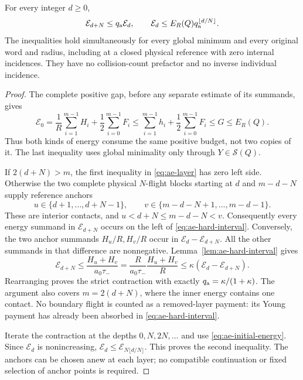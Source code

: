 \begin{theorem}
\label{thm:ae-layer}
For every integer $d\ge0$,
\begin{equation}\label{eq:ae-layer}
 \mathcal E_{d+N}\le q_{\rm a}\mathcal E_d,
 \qquad
 \mathcal E_d\le E_R(Q)q_{\rm a}^{\lfloor d/N\rfloor}.
\end{equation}
The inequalities hold simultaneously for every global minimum and
every original word and radius, including at a closed physical
reference with zero internal incidences.  They have no collision-count
prefactor and no inverse individual incidence.
\end{theorem}
\begin{proof}
The complete positive gap, before any separate estimate of its
summands, gives
\begin{equation}\label{eq:ae-initial-energy}
 \mathcal E_0
 =\frac1R\sum_{i=1}^{m-1}H_i+\frac12\sum_{i=0}^{m-1}F_i
 \le\sum_{i=1}^{m-1}h_i+\frac12\sum_{i=0}^{m-1}F_i
 \le G\le E_R(Q).
\end{equation}
Thus both kinds of energy consume the same positive budget, not
two copies of it.  The last inequality uses global minimality only
through $Y\in\mathcal S(Q)$.

If $2(d+N)>m$, the first inequality in \eqref{eq:ae-layer} has zero
left side.  Otherwise the two complete physical $N$-flight blocks
starting at $d$ and $m-d-N$ supply reference anchors
\[
 u\in\{d+1,\ldots,d+N-1\},\qquad
 v\in\{m-d-N+1,\ldots,m-d-1\}.
\]
These are interior contacts, and $u<d+N\le m-d-N<v$.
Consequently every energy summand in $\mathcal E_{d+N}$ occurs
on the left of \eqref{eq:ae-hard-interval}.  Conversely, the two
anchor summands $H_u/R,H_v/R$ occur in
$\mathcal E_d-\mathcal E_{d+N}$.  All the other summands in that
difference are nonnegative.  Lemma~\ref{lem:ae-hard-interval} gives
\[
 \mathcal E_{d+N}
 \le\frac{H_u+H_v}{a_0\tau_-}
 =\frac{R}{a_0\tau_-}\frac{H_u+H_v}{R}
 \le\kappa(\mathcal E_d-\mathcal E_{d+N}).
\]
Rearranging proves the strict contraction with exactly
$q_{\rm a}=\kappa/(1+\kappa)$.  The argument also covers
$m=2(d+N)$, where the inner energy contains one contact.  No boundary
flight is counted as a removed-layer payment: its Young payment has
already been absorbed in \eqref{eq:ae-hard-interval}.

Iterate the contraction at the depths $0,N,2N,\ldots$ and use
\eqref{eq:ae-initial-energy}.  Since $\mathcal E_d$ is nonincreasing,
$\mathcal E_d\le\mathcal E_{N\lfloor d/N\rfloor}$.
This proves the second inequality.  The anchors can be chosen anew
at each layer; no compatible continuation or fixed selection of
anchor points is required.
\end{proof}

